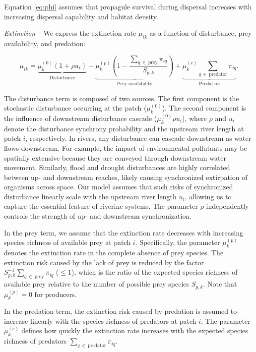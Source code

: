 \documentclass[11pt, class=article, crop=false]{standalone}
\begin{document}
Equation \ref{eq:phi} assumes that propagule survival during dispersal increases with increasing dispersal capability and habitat density.

\textit{Extinction} -- 
We express the extinction rate $\mu_{ik}$ as a function of disturbance, prey availability, and predation:

\begin{equation}
    \mu_{ik} = 
        \underbrace{\mu_{k}^{(0)} (1 + \rho u_i)}_{\text{Disturbance}} + 
        \underbrace{\mu_{k}^{(p)} \left(1 - \frac{\sum_{q~\in~\text{prey}} \pi_{iq}}{S_{p, k}} \right)}_{\text{Prey availability}} + 
        \underbrace{\mu_{k}^{(c)} \sum_{q~\in~\text{predator}} \pi_{iq}}_{\text{Predation}}.
    \label{eq:extn}
\end{equation}

The disturbance term is composed of two sources.
The first component is the stochastic disturbance occurring at the patch ($\mu_{k}^{(0)}$).
The second component is the influence of downstream disturbance cascade ($\mu_{k}^{(0)} \rho u_i$), where $\rho$ and $u_i$ denote the disturbance synchrony probability and the upstream river length at patch $i$, respectively.
In rivers, any disturbance can cascade downstream as water flows downstream.
For example, the impact of environmental pollutants may be spatially extensive because they are conveyed through downstream water movement.
Similarly, flood and drought disturbances are highly correlated between up- and downstream reaches, likely causing synchronized extirpation of organisms across space.
Our model assumes that such risks of synchronized disturbance linearly scale with the upstream river length $u_i$, allowing us to capture the essential feature of riverine systems.
The parameter $\rho$ independently controls the strength of up- and downstream synchronization.

In the prey term, we assume that the extinction rate decreases with increasing species richness of available prey at patch $i$.
Specifically, the parameter $\mu_{k}^{(p)}$ denotes the extinction rate in the complete absence of prey species.
The extinction risk caused by the lack of prey is reduced by the factor $S_{p, k}^{-1} \sum_{q~\in~\text{prey}} \pi_{iq}$ ($\le 1$), which is the ratio of the expected species richness of available prey relative to the number of possible prey species $S_{p, k}$.
Note that $\mu_{k}^{(p)} = 0$ for producers.

In the predation term, the extinction risk caused by predation is assumed to increase linearly with the species richness of predators at patch $i$.
The parameter $\mu_{k}^{(c)}$ defines how quickly the extinction rate increases with the expected species richness of predators $\sum_{q~\in~\text{predator}} \pi_{iq}$.
\end{document}
